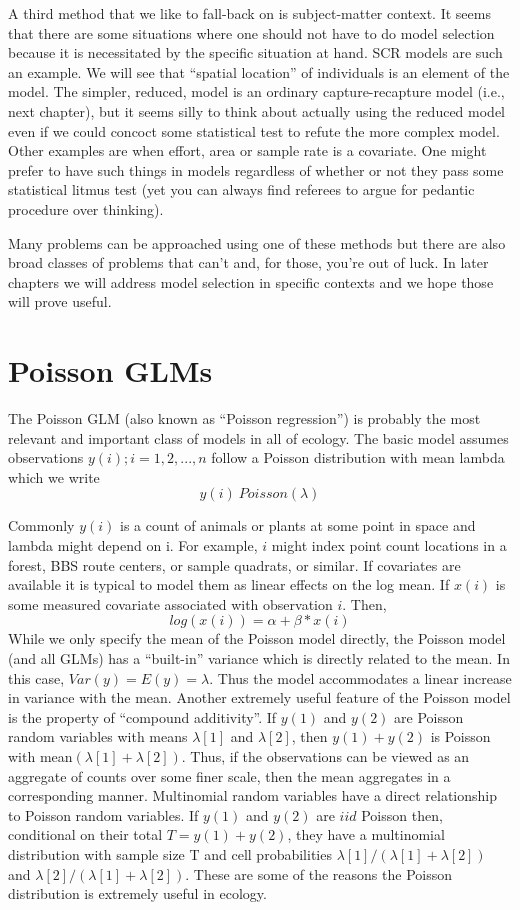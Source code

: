 A third method that we like to fall-back on is subject-matter context. It seems that there are some situations where one should not have to do model selection because it is necessitated by the specific situation at hand. SCR models are such an example. We will see that ``spatial location'' of individuals is an element of the model. The simpler, reduced, model is an ordinary capture-recapture model (i.e., next chapter), but it seems silly to think about actually using the reduced model even if we could concoct some statistical test to refute the more complex model.  Other examples are when effort, area or sample rate is a covariate. One might prefer to have such things in models regardless of whether or not they pass some statistical litmus test (yet you can always find referees to argue for pedantic procedure over thinking). 
	
Many problems can be approached using one of these methods but there are also broad classes of problems that can't and, for those, you're out of luck. In later chapters we will address model selection in specific contexts and we hope those will prove useful.  


\section{Poisson GLMs}
The Poisson GLM (also known as ``Poisson regression'') is probably the most relevant and important class of models in all of ecology. The basic model assumes observations $y(i); i=1,2,...,n$ follow a Poisson distribution with mean lambda which we write
\[
 	y(i) ~Poisson(\lambda)\]

Commonly $y(i)$ is a count of animals or plants at some point in space and lambda might depend on i. For example, $i$ might index point count locations in a forest, BBS route centers, or sample quadrats, or similar.  If covariates are available it is typical to model them as linear effects on the log mean. If $x(i)$ is some measured covariate associated with observation $i$. Then,
\[
 	log(x(i)) = \alpha  + \beta*x(i)
\]
While we only specify the mean of the Poisson model directly, the Poisson model (and all GLMs) has a ``built-in'' variance which is directly related to the mean. In this case, $Var(y) = E(y) = \lambda$. Thus the model accommodates a linear increase in variance with the mean.  Another extremely useful feature of the Poisson model is the property of ``compound additivity''. If $y(1)$ and $y(2)$ are Poisson random variables with means $\lambda[1]$ and $\lambda[2]$, then $y(1)+y(2)$ is Poisson with mean$(\lambda[1]+\lambda[2])$. Thus, if the observations can be viewed as an aggregate of counts over some finer scale, then the mean aggregates in a corresponding manner.  Multinomial random variables have a direct relationship to Poisson random variables. If $y(1)$ and $y(2)$ are $iid$ Poisson then, conditional on their total $T = y(1) + y(2)$, they have a multinomial distribution with sample size T and cell probabilities $\lambda[1]/(\lambda[1]+\lambda[2])$ and $\lambda[2]/(\lambda[1]+\lambda[2])$.  These are some of the reasons the Poisson distribution is extremely useful in ecology.



